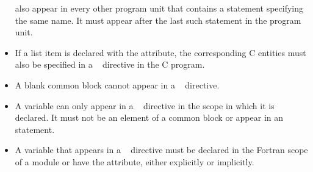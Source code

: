 \begin{fortranspecific}
\begin{itemize}
      also appear in every other program unit that contains a 
      statement specifying the same name. It must appear after the last
      such  statement in the program unit.
\item If a list item is declared with the  attribute, the
      corresponding C entities must also be specified in a
      ~ directive in the C program.
\item A blank common block cannot appear in a ~
      directive.
\item A variable can only appear in a ~ directive
      in the scope in which it is declared. It must not be an element of a
      common block or appear in an  statement.
\item A variable that appears in a ~ directive
      must be declared in the Fortran scope of a module or have the
       attribute, either explicitly or implicitly.
\end{itemize}
\end{fortranspecific}
